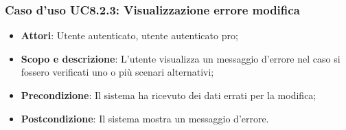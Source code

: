 	\subsubsection{Caso d'uso UC8.2.3: Visualizzazione errore modifica}
	\begin{itemize}
		\item
			\textbf{Attori}: Utente autenticato, utente autenticato pro;
		\item
			\textbf{Scopo e descrizione}: L'utente visualizza un messaggio d'errore nel caso si fossero verificati uno o più scenari alternativi;
		\item		
			\textbf{Precondizione}: Il sistema ha ricevuto dei dati errati per la modifica;
		\item
			\textbf{Postcondizione}: Il sistema mostra un messaggio d'errore.
	\end{itemize}	
	
